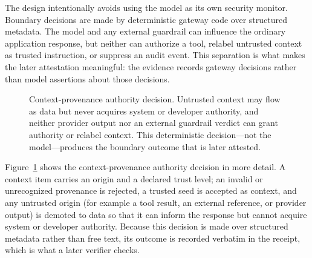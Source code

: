 \documentclass[sigconf,anonymous,review]{acmart}
\begin{document}
The design intentionally avoids using the model as its own security monitor. Boundary decisions are made by deterministic gateway code over structured metadata. The model and any external guardrail can influence the ordinary application response, but neither can authorize a tool, relabel untrusted context as trusted instruction, or suppress an audit event. This separation is what makes the later attestation meaningful: the evidence records gateway decisions rather than model assertions about those decisions.

\begin{figure}[t]
  \centering
  \caption{Context-provenance authority decision. Untrusted context may flow as data but never acquires system or developer authority, and neither provider output nor an external guardrail verdict can grant authority or relabel context. This deterministic decision---not the model---produces the boundary outcome that is later attested.}
  \label{fig:provenance}
\end{figure}

Figure~\ref{fig:provenance} shows the context-provenance authority decision in more detail. A context item carries an origin and a declared trust level; an invalid or unrecognized provenance is rejected, a trusted seed is accepted as context, and any untrusted origin (for example a tool result, an external reference, or provider output) is demoted to data so that it can inform the response but cannot acquire system or developer authority. Because this decision is made over structured metadata rather than free text, its outcome is recorded verbatim in the receipt, which is what a later verifier checks.
\end{document}

